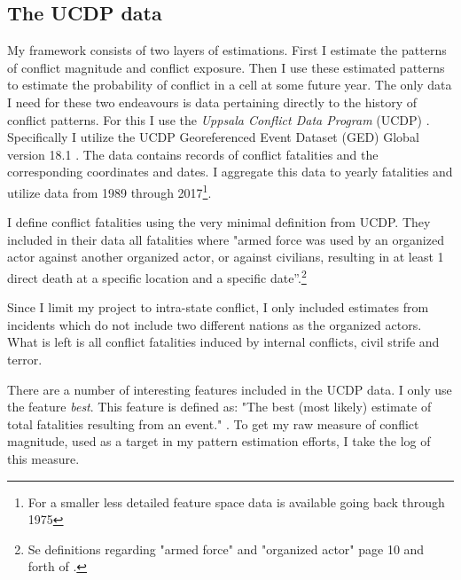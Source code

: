 \documentclass[a4paper]{article}
\begin{document}
\subsection{The UCDP data}





My framework consists of two layers of estimations. First I estimate the patterns of conflict magnitude and conflict exposure. Then I use these estimated patterns to estimate the probability of conflict in a cell at some future year. The only data I need for these two endeavours is data pertaining directly to the history of conflict patterns. For this I use the \emph{Uppsala Conflict Data Program} (UCDP) \citep{Sundberg_2013, Croicu_Sundberg_2017}. Specifically I utilize the UCDP Georeferenced Event Dataset (GED) Global version 18.1 \citep{UCDP_2017}. The data contains records of conflict fatalities and the corresponding coordinates and dates. I aggregate this data to yearly fatalities and utilize data from 1989 through 2017\footnote{For a smaller less detailed feature space data is available going back through 1975}.\par 

I define conflict fatalities using the very minimal definition from UCDP. They included in their data all fatalities where "armed force was used by an organized actor against another organized actor, or against civilians, resulting in at least 1 direct death at a specific location and a specific date”.\cite[9]{Croicu_Sundberg_2017}\footnote{Se definitions regarding "armed force" and "organized actor" page 10 and forth of \cite{Croicu_Sundberg_2017}.}\par 

Since I limit my project to intra-state conflict, I only included estimates from incidents which do not include two different nations as the organized actors. What is left is all conflict fatalities induced by internal conflicts, civil strife and terror.\par

There are a number of interesting features included in the UCDP data. I only use the feature \emph{best}. This feature is defined as: "The best (most likely) estimate of total fatalities resulting from an event." \cite[7]{Croicu_Sundberg_2017}. To get my raw measure of conflict magnitude, used as a target in my pattern estimation efforts, I take the log of this measure.\par
\end{document}
